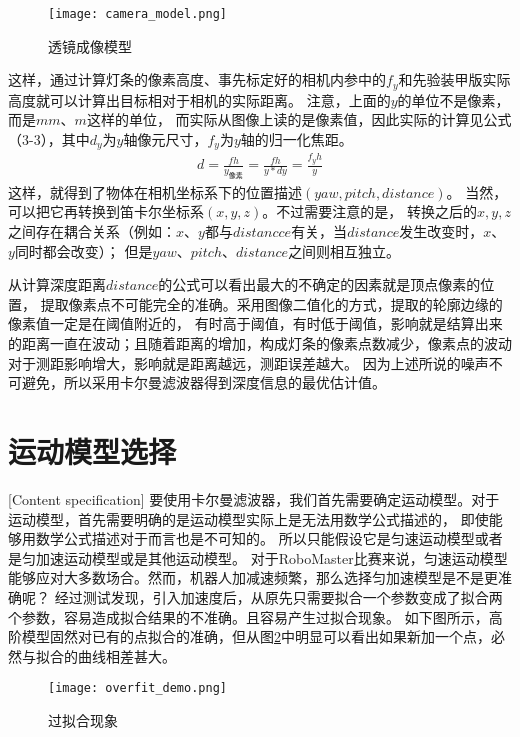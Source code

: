 \begin{figure}[H]
    \centering
    \texttt{[image: camera\_model.png]} 
    \caption{透镜成像模型}
    \label{透镜成像模型} 
\end{figure}    
这样，通过计算灯条的像素高度、事先标定好的相机内参中的$f_y$和先验装甲版实际高度就可以计算出目标相对于相机的实际距离。
注意，上面的$y$的单位不是像素，而是$mm$、$m$这样的单位，
而实际从图像上读的是像素值，因此实际的计算见公式（3-3），其中$d_y$为$y$轴像元尺寸，$f_y$为$y$轴的归一化焦距。
\begin{gather}
    d=\frac{fh}{y_{像素}}=\frac{fh}{y*dy}=\frac{f_yh}{y}
\end{gather}
这样，就得到了物体在相机坐标系下的位置描述$(yaw,pitch, distance)$。
当然，可以把它再转换到笛卡尔坐标系$(x,y,z)$。不过需要注意的是，
转换之后的$x,y,z$之间存在耦合关系（例如：$x$、$y$都与$distancce$有关，当$distance$发生改变时，$x$、$y$同时都会改变）；
但是$yaw$、$pitch$、$distance$之间则相互独立。\par

从计算深度距离$distance$的公式可以看出最大的不确定的因素就是顶点像素的位置，
提取像素点不可能完全的准确。采用图像二值化的方式，提取的轮廓边缘的像素值一定是在阈值附近的，
有时高于阈值，有时低于阈值，影响就是结算出来的距离一直在波动；且随着距离的增加，构成灯条的像素点数减少，像素点的波动对于测距影响增大，影响就是距离越远，测距误差越大。
因为上述所说的噪声不可避免，所以采用卡尔曼滤波器得到深度信息的最优估计值。\par

\section{运动模型选择}[Content specification]
要使用卡尔曼滤波器，我们首先需要确定运动模型。对于运动模型，首先需要明确的是运动模型实际上是无法用数学公式描述的，
即使能够用数学公式描述对于而言也是不可知的。 所以只能假设它是匀速运动模型或者是匀加速运动模型或是其他运动模型。
对于RoboMaster比赛来说，匀速运动模型能够应对大多数场合。然而，机器人加减速频繁，那么选择匀加速模型是不是更准确呢？ 
经过测试发现，引入加速度后，从原先只需要拟合一个参数变成了拟合两个参数，容易造成拟合结果的不准确。且容易产生过拟合现象。
如下图所示，高阶模型固然对已有的点拟合的准确，但从图\ref{过拟合现象}中明显可以看出如果新加一个点，必然与拟合的曲线相差甚大。
\begin{figure}[H]
    \centering
    \texttt{[image: overfit\_demo.png]} 
    \caption{过拟合现象} 
    \label{过拟合现象} 
\end{figure} 

